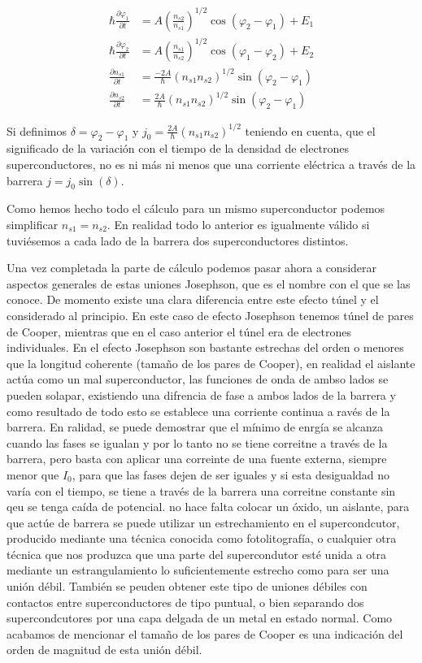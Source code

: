 \begin{align*}
    \hbar \frac{\partial \varphi_1}{\partial t} &= A (\frac{n_{s2}}{n_{s1}})^{1/2} \cos(\varphi_2 - \varphi_1) + E_1 \\
    \hbar \frac{\partial \varphi_2}{\partial t} &= A (\frac{n_{s1}}{n_{s2}})^{1/2} \cos(\varphi_1 - \varphi_2) + E_2 \\
    \frac{\partial n_{s1}}{\partial t} &= \frac{-2 A}{\hbar} (n_{s1} n_{s2})^{1/2} \sin(\varphi_2 - \varphi_1) \\
    \frac{\partial n_{s2}}{\partial t} &= \frac{2 A}{\hbar} (n_{s1} n_{s2})^{1/2} \sin(\varphi_2 - \varphi_1)
\end{align*}

Si definimos $\delta = \varphi_2 - \varphi_1$ y $j_0 = \frac{2 A}{\hbar} (n_{s1} n_{s2})^{1/2}$ teniendo en cuenta, que el significado de la variación con el tiempo de la densidad de electrones superconductores, no es ni más ni menos que una corriente eléctrica a través de la barrera $j = j_0 \sin(\delta)$.

Como hemos hecho todo el cálculo para un mismo superconductor podemos simplificar $n_{s1} = n_{s2}$. En realidad todo lo anterior es igualmente válido si tuviésemos a cada lado de la barrera dos superconductores distintos.

Una vez completada la parte de cálculo podemos pasar ahora a considerar aspectos generales de estas uniones Josephson, que es el nombre con el que se las conoce. De momento existe una clara diferencia entre este efecto túnel y el considerado al principio. En este caso de efecto Josephson tenemos túnel de pares de Cooper, mientras que en el caso anterior el túnel era de electrones individuales. En el efecto Josephson son bastante estrechas del orden o menores que la longitud coherente (tamaño de los pares de Cooper), en realidad el aislante actúa como un mal superconductor, las funciones de onda de ambso lados se pueden solapar, existiendo una difrencia de fase a ambos lados de la barrera y como resultado de todo esto se establece una corriente continua a ravés de la barrera. En ralidad, se puede demostrar que el mínimo de enrgía se alcanza cuando las fases se igualan y por lo tanto no se tiene correitne a través de la barrera, pero basta con aplicar una correinte de una fuente externa, siempre menor que $I_0$, para que las fases dejen de ser iguales y si esta desigualdad no varía con el tiempo, se tiene a través de la barrera una correitne constante sin qeu se tenga caída de potencial. no hace falta colocar un óxido, un aislante, para que actúe de barrera se puede utilizar un estrechamiento en el supercondcutor, producido mediante una técnica conocida como fotolitografía, o cualquier otra técnica que nos produzca que una parte del supercondutor esté unida a otra mediante un estrangulamiento lo suficientemente estrecho como para ser una unión débil. También se peuden obtener este tipo de uniones débiles con contactos entre superconductores de tipo puntual, o bien separando dos supercondcutores por una capa delgada de un metal en estado normal. Como acabamos de mencionar el tamaño de los pares de Cooper es una indicación del orden de magnitud de esta unión débil.

